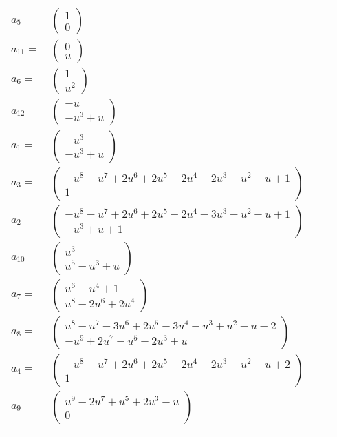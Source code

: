 \documentclass[1p]{elsarticle_modified}
\theoremstyle{definition}
\begin{document}
\begin{tabular}{m{7pt} m{180pt} m{7pt} m{180pt} }
\flushright $a_{5}=$&$\begin{pmatrix}1\\0\end{pmatrix}$ \\
\flushright $a_{11}=$&$\begin{pmatrix}0\\u\end{pmatrix}$ \\
\flushright $a_{6}=$&$\begin{pmatrix}1\\u^2\end{pmatrix}$ \\
\flushright $a_{12}=$&$\begin{pmatrix}- u\\- u^3+u\end{pmatrix}$ \\
\flushright $a_{1}=$&$\begin{pmatrix}- u^3\\- u^3+u\end{pmatrix}$ \\
\flushright $a_{3}=$&$\begin{pmatrix}- u^8- u^7+2 u^6+2 u^5-2 u^4-2 u^3- u^2- u+1\\1\end{pmatrix}$ \\
\flushright $a_{2}=$&$\begin{pmatrix}- u^8- u^7+2 u^6+2 u^5-2 u^4-3 u^3- u^2- u+1\\- u^3+u+1\end{pmatrix}$ \\
\flushright $a_{10}=$&$\begin{pmatrix}u^3\\u^5- u^3+u\end{pmatrix}$ \\
\flushright $a_{7}=$&$\begin{pmatrix}u^6- u^4+1\\u^8-2 u^6+2 u^4\end{pmatrix}$ \\
\flushright $a_{8}=$&$\begin{pmatrix}u^8- u^7-3 u^6+2 u^5+3 u^4- u^3+u^2- u-2\\- u^9+2 u^7- u^5-2 u^3+u\end{pmatrix}$ \\
\flushright $a_{4}=$&$\begin{pmatrix}- u^8- u^7+2 u^6+2 u^5-2 u^4-2 u^3- u^2- u+2\\1\end{pmatrix}$ \\
\flushright $a_{9}=$&$\begin{pmatrix}u^9-2 u^7+u^5+2 u^3- u\\0\end{pmatrix}$\\&\end{tabular}
\end{document}
